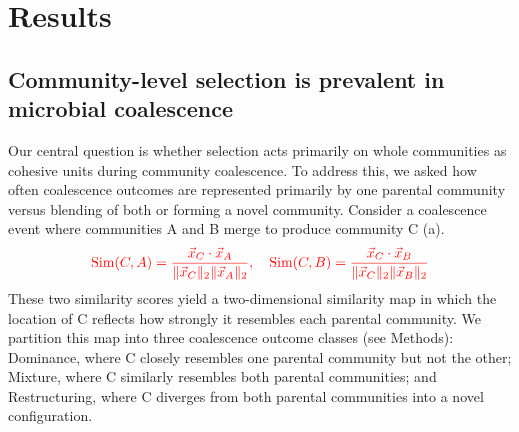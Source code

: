 \section{Results}
\label{sec:results}



\subsection{Community-level selection is prevalent in microbial coalescence}
\label{sec:results:dominance_prevalent}

Our central question is whether selection acts primarily on whole communities as cohesive units during community coalescence. To address this, we asked how often coalescence outcomes are represented primarily by one parental community versus blending of both or forming a novel community. Consider a coalescence event where communities A and B merge to produce community C (a). 
\begin{equation}
\textcolor{red}{\text{Sim}(C, A) = \frac{\vec{x}_C \cdot \vec{x}_A}{\|\vec{x}_C\|_2 \|\vec{x}_A\|_2}, \quad \text{Sim}(C, B) = \frac{\vec{x}_C \cdot \vec{x}_B}{\|\vec{x}_C\|_2 \|\vec{x}_B\|_2}}
\label{eq:similarity}
\end{equation}
 These two similarity scores yield a two-dimensional similarity map in which the location of C reflects how strongly it resembles each parental community. We partition this map into three coalescence outcome classes (see Methods): Dominance, where C closely resembles one parental community but not the other; Mixture, where C similarly resembles both parental communities; and Restructuring, where C diverges from both parental communities into a novel configuration.  

